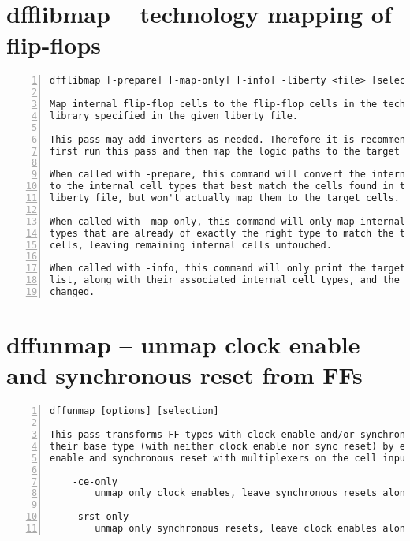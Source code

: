 \section{dfflibmap -- technology mapping of flip-flops}
\label{cmd:dfflibmap}
\begin{lstlisting}[numbers=left,frame=single]
    dfflibmap [-prepare] [-map-only] [-info] -liberty <file> [selection]

Map internal flip-flop cells to the flip-flop cells in the technology
library specified in the given liberty file.

This pass may add inverters as needed. Therefore it is recommended to
first run this pass and then map the logic paths to the target technology.

When called with -prepare, this command will convert the internal FF cells
to the internal cell types that best match the cells found in the given
liberty file, but won't actually map them to the target cells.

When called with -map-only, this command will only map internal cell
types that are already of exactly the right type to match the target
cells, leaving remaining internal cells untouched.

When called with -info, this command will only print the target cell
list, along with their associated internal cell types, and the argumentsthat would be passed to the dfflegalize pass.  The design will not be
changed.
\end{lstlisting}

\section{dffunmap -- unmap clock enable and synchronous reset from FFs}
\label{cmd:dffunmap}
\begin{lstlisting}[numbers=left,frame=single]
    dffunmap [options] [selection]

This pass transforms FF types with clock enable and/or synchronous reset into
their base type (with neither clock enable nor sync reset) by emulating the clock
enable and synchronous reset with multiplexers on the cell input.

    -ce-only
        unmap only clock enables, leave synchronous resets alone.

    -srst-only
        unmap only synchronous resets, leave clock enables alone.
\end{lstlisting}

